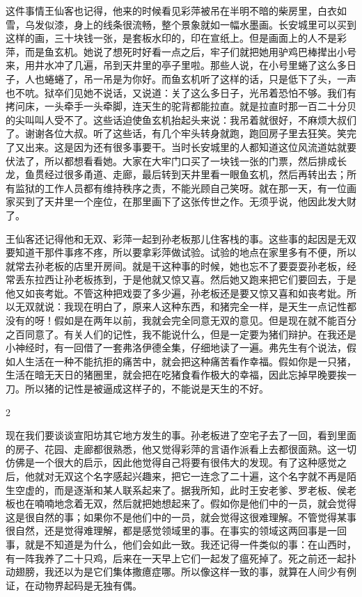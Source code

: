 这件事情王仙客也记得，他来的时候看见彩萍被吊在半明不暗的柴房里，白衣如雪，乌发似漆，身上的线条很流畅，整个景象就如一幅水墨画。长安城里可以买到这样的画，三十块钱一张，是套板水印的，印在宣纸上。但是画面上的人不是彩萍，而是鱼玄机。她说了想死时好看一点之后，牢子们就把她用驴鸡巴棒撵出小号来，用井水冲了几遍，吊到天井里的亭子里啦。那些人说，在小号里蜷了这么多日子，人也蜷蜷了，吊一吊是为你好。而鱼玄机听了这样的话，只是低下了头，一声也不吭。狱卒们见她不说话，又说道：关了这么多日子，光吊着恐怕不够。我们有拷问床，一头牵手一头牵脚，连天生的驼背都能拉直。就是拉直时那一百二十分贝的尖叫叫人受不了。这些话迫使鱼玄机抬起头来说：我吊着就很好，不麻烦大叔们了。谢谢各位大叔。听了这些话，有几个牢头转身就跑，跑回房子里去狂笑。笑完了又出来。这是因为还有很多事要干。当时长安城里的人都知道这位风流道姑就要伏法了，所以都想看看她。大家在大牢门口买了一块钱一张的门票，然后排成长龙，鱼贯经过很多甬道、走廊，最后转到天井里看一眼鱼玄机，然后再转出去；所有监狱的工作人员都有维持秩序之责，不能光顾自己笑呀。就在那一天，有一位画家买到了天井里一个座位，在那里画下了这张传世之作。无须乎说，他因此发大财了。 

王仙客还记得他和无双、彩萍一起到孙老板那儿住客栈的事。这些事的起因是无双要知道干那件事疼不疼，所以要拿彩萍做试验。试验的地点在家里多有不便，所以就常去孙老板的店里开房间。就是干这种事的时候，她也忘不了要耍耍孙老板，经常丢东拉西让孙老板拣到，于是他就又惊又喜。然后她又跑来把它们要回去，于是他又如丧考妣。不管这种把戏耍了多少遍，孙老板还是要又惊又喜和如丧考妣。所以无双就说：我现在明白了，原来人这种东西，和猪完全一样，是天生一点记性都没有的呀！假如是在两年以前，我就会完全同意无双的意见。但是现在就不能百分之百同意了。有关人们的记性，我不能说什么，但是一定要为猪们辩护。在我还是小神经时，有一回借了一套弗洛伊德全集，仔细地读了一遍。弗先生有个说法，假如人生活在一种不能抗拒的痛苦中，就会把这种痛苦看作幸福。假如你是一只猪，生活在暗无天日的猪圈里，就会把在吃猪食看作极大的幸福，因此忘掉早晚要挨一刀。所以猪的记性是被逼成这样子的，不能说是天生的不好。 

2 

现在我们要谈谈宣阳坊其它地方发生的事。孙老板进了空宅子去了一回，看到里面的房子、花园、走廊都很熟悉，他又觉得彩萍的言语作派看上去都很面熟。这一切仿佛是一个很大的启示，因此他觉得自己将要有很伟大的发现。有了这种感觉之后，他就对无双这个名字感起兴趣来，把它一连念了二十遍，这个名字就不再是陌生空虚的，而是逐渐和某人联系起来了。据我所知，此时王安老爹、罗老板、侯老板也在喃喃地念着无双，然后就把她想起来了。假如你是他们中的一员，就会觉得这是很自然的事；如果你不是他们中的一员，就会觉得这很难理解。不管觉得某事很自然，还是觉得难理解，都是感觉领域里的事。在事实的领域这两回事是一回事，就是不知道是为什么，他们会如此一致。我还记得一件类似的事：在山西时，有一阵我养了二十只鸡，后来在一天早上它们一起发了瘟死掉了。死之前还一起扑动翅膀，我还以为是它们集体撒癔症哪。所以像这样一致的事，就算在人间少有例证，在动物界起码是无独有偶。 

